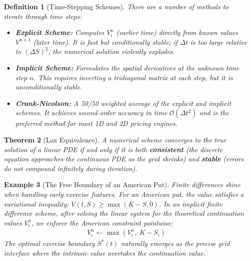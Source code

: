 \documentclass{report}
\theoremstyle{spacedplain}
\newtheorem{theorem}{Theorem}[section]
\theoremstyle{spaceddefinition}
\newtheorem{definition}[theorem]{Definition}
\newtheorem{example}[theorem]{Example}
\theoremstyle{spacedremark}
\begin{document}
\begin{definition}[Time-Stepping Schemes]
There are a number of methods to iterate through time steps:
\begin{itemize}
    \item \textbf{Explicit Scheme:} Computes $V_i^n$ (earlier time) directly from known values $V^{n+1}$ (later time). It is fast but conditionally stable; if $\Delta t$ is too large relative to $(\Delta S)^2$, the numerical solution violently explodes.
    \item \textbf{Implicit Scheme:} Formulates the spatial derivatives at the unknown time step $n$. This requires inverting a tridiagonal matrix at each step, but it is unconditionally stable.
    \item \textbf{Crank-Nicolson:} A 50/50 weighted average of the explicit and implicit schemes. It achieves second-order accuracy in time $\mathcal{O}(\Delta t^2)$ and is the preferred method for most 1D and 2D pricing engines.
\end{itemize}
\end{definition}

\begin{theorem}[Lax Equivalence]
A numerical scheme converges to the true solution of a linear PDE if and only if it is both \textbf{consistent} (the discrete equation approaches the continuous PDE as the grid shrinks) and \textbf{stable} (errors do not compound infinitely during iteration). 
\end{theorem}

\begin{example}[The Free Boundary of an American Put]
Finite differences shine when handling early exercise features. For an American put, the value satisfies a variational inequality: $V(t,S) \ge \max(K-S,0)$. In an implicit finite difference scheme, after solving the linear system for the theoretical continuation values $V_i^n$, we enforce the American constraint pointwise:
\begin{align}
    V_i^n \leftarrow \max(V_i^n,\; K-S_i)
\end{align}
The optimal exercise boundary $S^\ast(t)$ naturally emerges as the precise grid interface where the intrinsic value overtakes the continuation value.
\end{example}
\end{document}
